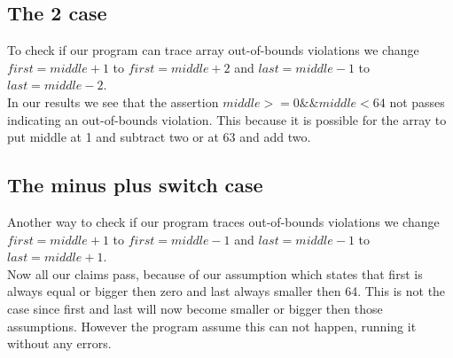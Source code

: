 \documentclass[a4paper]{article}
\begin{document}
	\subsection{The 2 case}
	To check if our program can trace array out-of-bounds violations we change  $first = middle +1$ to $first = middle + 2$ and $last = middle - 1$ to $last = middle - 2$. \\
	In our results we see that the assertion $middle >= 0  \&\&  middle < 64$ not passes indicating an out-of-bounds violation. This because it is possible for the array to put middle at 1 and subtract two or at 63 and add two.
	
	
	\subsection{The minus plus switch case}
	Another way to check if our program traces out-of-bounds violations we change $first = middle +1$ to $first = middle - 1$ and $last = middle - 1$ to $last = middle + 1$.\\
	Now all our claims pass, because of our assumption which states that first is always equal or bigger then zero and last always smaller then 64. This is not the case since first and last will now become smaller or bigger then those assumptions. However the program assume this can not happen, running it without any errors.
	
	
\end{document}
